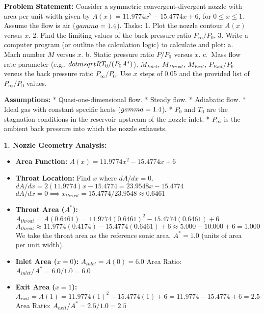 \textbf{Problem Statement:} Consider a symmetric convergent-divergent
nozzle with area per unit width given by
\(A(x) = 11.9774x^2 - 15.4774x + 6\), for \(0 \le x \le 1\). Assume the
flow is air (\(\\gamma = 1.4\)). Tasks: 1. Plot the nozzle contour
\(A(x)\) versus \(x\). 2. Find the limiting values of the back pressure
ratio \(P_{\infty} / P_0\). 3. Write a computer program (or outline the
calculation logic) to calculate and plot: a. Mach number \(M\) versus
\(x\). b. Static pressure ratio \(P / P_0\) versus \(x\). c.~Mass flow
rate parameter (e.g., \(\\dot{m} \\sqrt{RT_0}/(P_0 A^*)\)),
\(M_{Inlet}\), \(M_{Throat}\), \(M_{Exit}\), \(P_{Exit} / P_0\) versus
the back pressure ratio \(P_{\infty} / P_0\). Use \(x\) steps of 0.05
and the provided list of \(P_{\infty} / P_0\) values.

\textbf{Assumptions:} * Quasi-one-dimensional flow. * Steady flow. *
Adiabatic flow. * Ideal gas with constant specific heats
(\(\\gamma = 1.4\)). * \(P_0\) and \(T_0\) are the stagnation conditions
in the reservoir upstream of the nozzle inlet. * \(P_{\infty}\) is the
ambient back pressure into which the nozzle exhausts.

\textbf{1. Nozzle Geometry Analysis:}

\begin{itemize}
\tightlist
\item
  \textbf{Area Function:} \(A(x) = 11.9774x^2 - 15.4774x + 6\)
\item
  \textbf{Throat Location:} Find \(x\) where \(dA/dx = 0\).
  \(dA/dx = 2(11.9774)x - 15.4774 = 23.9548x - 15.4774\)
  \(dA/dx = 0 \implies x_{throat} = 15.4774 / 23.9548 \approx 0.6461\)
\item
  \textbf{Throat Area (\(A^*\)):}
  \(A_{throat} = A(0.6461) = 11.9774(0.6461)^2 - 15.4774(0.6461) + 6\)
  \(A_{throat} \approx 11.9774(0.4174) - 15.4774(0.6461) + 6 \approx 5.000 - 10.000 + 6 = 1.000\)
  We take the throat area as the reference sonic area, \(A^* = 1.0\)
  (units of area per unit width).
\item
  \textbf{Inlet Area (\(x=0\)):} \(A_{inlet} = A(0) = 6.0\) Area Ratio:
  \(A_{inlet}/A^* = 6.0 / 1.0 = 6.0\)
\item
  \textbf{Exit Area (\(x=1\)):}
  \(A_{exit} = A(1) = 11.9774(1)^2 - 15.4774(1) + 6 = 11.9774 - 15.4774 + 6 = 2.5\)
  Area Ratio: \(A_{exit}/A^* = 2.5 / 1.0 = 2.5\)
\end{itemize}

